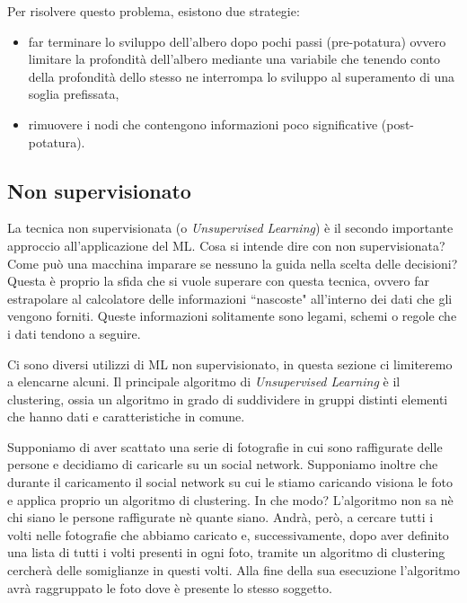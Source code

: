 \documentclass[12pt,italian]{report}
\begin{document}
Per risolvere questo problema, esistono due strategie:
\begin{itemize}
	\item far terminare lo sviluppo dell'albero dopo pochi passi (pre-potatura) ovvero limitare la profondità dell'albero mediante una variabile che tenendo conto della profondità dello stesso ne interrompa lo sviluppo al superamento di una soglia prefissata,
	
	\item rimuovere i nodi che contengono informazioni poco significative (post-potatura).
\end{itemize}

\subsection{Non supervisionato}
La tecnica non supervisionata (o \emph{Unsupervised Learning}) è il secondo importante approccio all'applicazione del ML. Cosa si intende dire con non supervisionata? Come può una macchina imparare se nessuno la guida nella scelta delle decisioni?
Questa è proprio la sfida che si vuole superare con questa tecnica, ovvero far estrapolare al calcolatore delle informazioni ``nascoste" all'interno dei dati che gli vengono forniti. Queste informazioni solitamente sono legami, schemi o regole che i dati tendono a seguire.

Ci sono diversi utilizzi di ML non supervisionato, in questa sezione ci limiteremo a elencarne alcuni. Il principale algoritmo di \emph{Unsupervised Learning} è il clustering, ossia un algoritmo in grado di suddividere in gruppi distinti elementi che hanno dati e caratteristiche in comune.

Supponiamo di aver scattato una serie di fotografie in cui sono raffigurate delle persone e decidiamo di caricarle su un social network. Supponiamo inoltre che durante il caricamento il social network su cui le stiamo caricando visiona le foto e applica proprio un algoritmo di clustering. In che modo? L'algoritmo non sa nè chi siano le persone raffigurate nè quante siano. Andrà, però, a cercare tutti i volti nelle fotografie che abbiamo caricato e, successivamente, dopo aver definito una lista di tutti i volti presenti in ogni foto, tramite un algoritmo di clustering cercherà delle somiglianze in questi volti. Alla fine della sua esecuzione l'algoritmo avrà raggruppato le foto dove è presente lo stesso soggetto.
\end{document}
